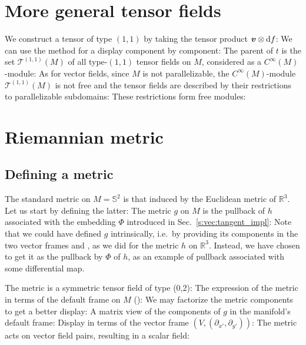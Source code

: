 \section{More general tensor fields}

We construct a tensor of type $(1,1)$ by taking the tensor product
$\bm{v}\otimes \mathrm{d}f$:
We can use the method  for a display component by
component:
The parent of $t$ is the set $\mathcal{T}^{(1,1)}(M)$ of all type-$(1,1)$
tensor fields on $M$,
considered as a $C^\infty(M)$-module:
As for vector fields, since $M$ is not parallelizable, the $C^\infty(M)$-module
$\mathcal{T}^{(1,1)}(M)$ is not free and the tensor fields are described by
their restrictions to parallelizable subdomains:
These restrictions form free modules:

\section{Riemannian metric}

\subsection{Defining a metric}

The standard metric on $M=\mathbb{S}^2$ is that induced by the Euclidean metric of $\mathbb{R}^3$. Let us start by defining the latter:
The metric $g$ on $M$ is the pullback of $h$ associated with the embedding $\Phi$
introduced in Sec.~\ref{s:vec:tangent_impl}:
Note that we could have defined $g$ intrinsically, i.e.\ by providing its components in the two vector frames  and , as we did for the metric $h$ on $\mathbb{R}^3$. Instead, we have chosen to get it as the pullback by $\Phi$ of $h$, as an example of pullback associated with some differential map.

The metric is a symmetric tensor field of type (0,2):
The expression of the metric in terms of the default frame on $M$ ():
We may factorize the metric components to get a better display:
A matrix view of the components of $g$ in the manifold's default frame:
Display in terms of the vector frame $(V, (\partial_{x'}, \partial_{y'}))$:
The metric acts on vector field pairs, resulting in a scalar field:

